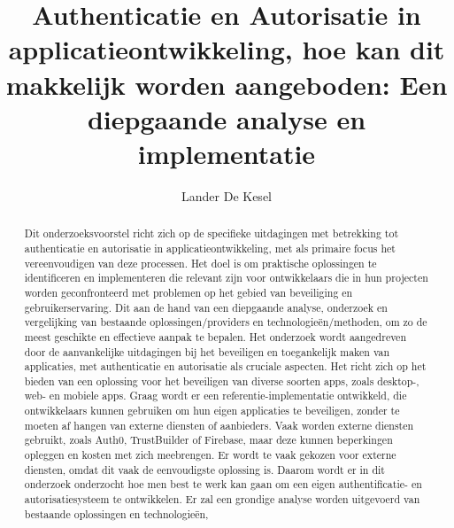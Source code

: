 \documentclass{hogent-article}
\title{Authenticatie en Autorisatie in applicatieontwikkeling, hoe kan dit makkelijk worden aangeboden: Een diepgaande analyse en implementatie}
\author{Lander De Kesel}
\begin{document}
\begin{abstract}
  Dit onderzoeksvoorstel richt zich op de specifieke uitdagingen met betrekking tot authenticatie en autorisatie in applicatieontwikkeling, met als primaire 
focus het vereenvoudigen van deze processen. Het doel is om praktische oplossingen te identificeren en implementeren die relevant zijn voor ontwikkelaars 
die in hun projecten worden geconfronteerd met problemen op het gebied van beveiliging en gebruikerservaring. Dit aan de hand van een diepgaande analyse,
onderzoek en vergelijking van bestaande oplossingen/providers en technologieën/methoden, om zo de meest geschikte en effectieve aanpak te bepalen. 
\newline
\newline
Het onderzoek wordt aangedreven door de aanvankelijke uitdagingen bij het beveiligen en toegankelijk maken van applicaties, met authenticatie en 
autorisatie als cruciale aspecten. Het richt zich op het bieden van een oplossing voor het beveiligen van diverse soorten apps, zoals desktop-, 
web- en mobiele apps. Graag wordt er een referentie-implementatie ontwikkeld, die ontwikkelaars kunnen gebruiken om hun eigen applicaties te beveiligen,
zonder te moeten af hangen van externe diensten of aanbieders. Vaak worden externe diensten gebruikt, zoals Auth0, TrustBuilder of Firebase, maar deze
kunnen beperkingen opleggen en kosten met zich meebrengen. Er wordt te vaak gekozen voor externe diensten, omdat dit vaak de eenvoudigste oplossing is.
Daarom wordt er in dit onderzoek onderzocht hoe men best te werk kan gaan om een eigen authentificatie- en autorisatiesysteem te ontwikkelen.
\newline
\newline
Er zal een grondige analyse worden uitgevoerd van bestaande oplossingen en technologieën,

\end{abstract}
\end{document}
